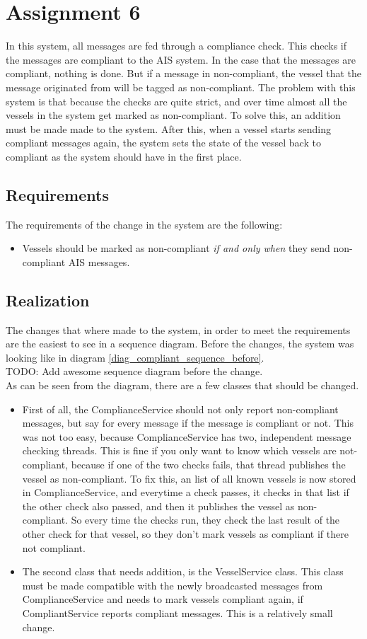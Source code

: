 \documentclass[12pt]{article}
\begin{document}
\section*{Assignment 6}
In this system, all messages are fed through a compliance check. This checks if the messages are compliant to the AIS system. In the case that the messages are compliant, nothing is done. But if a message in non-compliant, the vessel that the message originated from will be tagged as non-compliant. The problem with this system is that because the checks are quite strict, and over time almost all the vessels in the system get marked as non-compliant. To solve this, an addition must be made made to the system. After this, when a vessel starts sending compliant messages again, the system sets the state of the vessel back to compliant as the system should have in the first place.

\subsection*{Requirements}
The requirements of the change in the system are the following:
\begin{itemize}
\item Vessels should be marked as non-compliant \emph{if and only when} they send non-compliant AIS messages.
\end{itemize}

\subsection*{Realization}
The changes that where made to the system, in order to meet the requirements are the easiest to see in a sequence diagram. Before the changes, the system was looking like in diagram \ref{diag_compliant_sequence_before}.
\\
TODO: Add awesome sequence diagram before the change.
\\
As can be seen from the diagram, there are a few classes that should be changed.
\begin{itemize}
\item First of all, the ComplianceService should not only report non-compliant messages, but say for every message if the message is compliant or not. This was not too easy, because ComplianceService has two, independent message checking threads. This is fine if you only want to know which vessels are not-compliant, because if one of the two checks fails, that thread publishes the vessel as non-compliant. To fix this, an list of all known vessels is now stored in ComplianceService, and everytime a check passes, it checks in that list if the other check also passed, and then it publishes the vessel as non-compliant. So every time the checks run, they check the last result of the other check for that vessel, so they don't mark vessels as compliant if there not compliant.
\item The second class that needs addition, is the VesselService class. This class must be made compatible with the newly broadcasted messages from ComplianceService and needs to mark vessels compliant again, if CompliantService reports compliant messages. This is a relatively small change.
\end{itemize}
\end{document}
